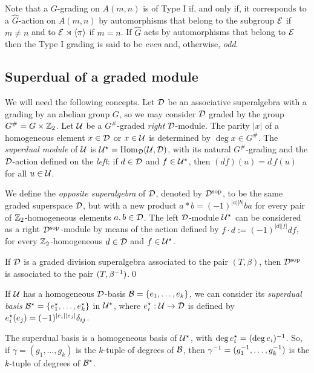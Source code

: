 Note that a $G$-grading on $A(m,n)$ is of Type I if, and only if, it corresponds to a $\widehat{G}$-action on $A(m,n)$ by automorphisms that belong to 
the subgroup $\mathcal E$ if $m\ne n$ and to $\mathcal E\rtimes\langle\pi\rangle$ if $m=n$. If $\widehat{G}$ acts by automorphisms that belong to $\mathcal E$ then the 
Type I grading is said to be \emph{even} and, otherwise, \emph{odd}.

\subsection{Superdual of a graded module}\label{ssec:superdual}

We will need the following concepts. Let $\mathcal{D}$ be an associative superalgebra with a grading by an abelian group $G$, so we may consider $\mathcal{D}$ graded by the group $G^\# = G\times \mathbb{Z}_2$. Let $\mathcal U$ be a $G^\#$-graded \emph{right} $\mathcal{D}$-module. The parity $|x|$ of a homogeneous element $x \in \mathcal{D}$ or $x\in \mathcal U$ is determined by $\deg x \in G^\#$. The \emph{superdual module} of $\mathcal U$ is $\mathcal U^\star = \operatorname{Hom}_{\mathcal{D}} (\mathcal U,\mathcal{D})$, with its natural $G^\#$-grading and the $\mathcal{D}$-action defined on the \emph{left}: if $d \in \mathcal{D}$ and $f \in \mathcal U ^\star$, then $(df)(u) = d\, f(u)$ for all $u\in \mathcal U$.

We define the \emph{opposite superalgebra} of $\mathcal{D}$, denoted by $\mathcal{D}^{\mathrm{sop}}$, to be the same graded superspace $\mathcal{D}$, but with a new product $a*b = (-1)^{|a||b|} ba$ for every pair of $\mathbb{Z}_2$-homogeneous elements $a,b \in \mathcal{D}$. The left $\mathcal{D}$-module $\mathcal U^\star$ can be considered as a right $\mathcal{D}^{\mathrm{sop}}$-module by means of the action defined by $f\cdot d := (-1)^{|d||f|} df$, for every $\mathbb{Z}_2$-homogeneous $d\in \mathcal{D}$ and $f\in \mathcal U^\star$.

\begin{lemma}\label{lemma:Dsop}
	If $\mathcal{D}$ is a graded division superalgebra associated to the pair $(T,\beta)$, then $\mathcal{D}^{\mathrm{sop}}$ is associated to the pair $(T,\beta^{-1})$.\qed
\end{lemma}

If $\mathcal U$ has a homogeneous $\mathcal{D}$-basis $\mathcal B = \{e_1, \ldots, e_k\}$, we can consider its \emph{superdual basis} $\mathcal B^\star = \{e_1^\star, \ldots, e_k^\star\}$ in $\mathcal U^\star$, where $e_i^\star : \mathcal U \rightarrow \mathcal{D}$ is defined by $e_i^\star (e_j) = (-1)^{|e_i||e_j|} \delta_{ij}$.

\begin{remark}\label{rmk:gamma-inv}
	The superdual basis is a homogeneous basis of $\mathcal U^\star$, with $\deg e_i^\star = (\deg e_i)^{-1}$. So, if $\gamma = (g_1, \ldots, g_k)$ is the $k$-tuple of degrees of $\mathcal B$, then $\gamma^{-1} = (g_1^{-1}, \ldots, g_k^{-1})$ is the $k$-tuple of degrees of $\mathcal B^\star$.
\end{remark}


